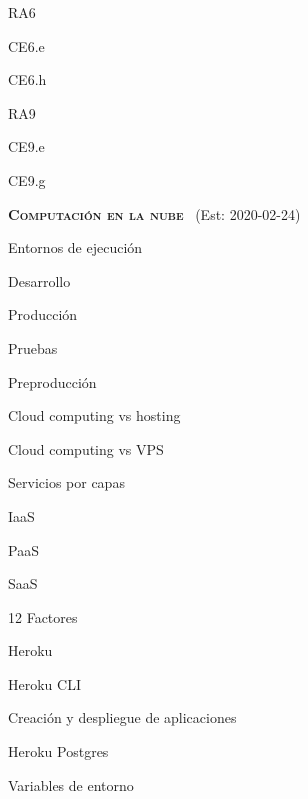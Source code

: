 \begin{longenum}
\begin{longenum}
\begin{longenum}
\begin{longenum}
                \item RA6
                \begin{longenum}
                    \item CE6.e
                    \item CE6.h
                \end{longenum}
                \item RA9
                \begin{longenum}
                    \item CE9.e
                    \item CE9.g
                \end{longenum}
            \end{longenum}
        \end{longenum}
    \end{longenum}
    \item \textbf{\textsc{Computación en la nube}} \ (Est: 2020-02-24)
    \begin{longenum}
        \item Entornos de ejecución
        \begin{longenum}
            \item Desarrollo
            \item Producción
            \item Pruebas
            \item Preproducción
        \end{longenum}
        \item Cloud computing vs hosting
        \item Cloud computing vs VPS
        \item Servicios por capas
        \begin{longenum}
            \item IaaS
            \item PaaS
            \item SaaS
        \end{longenum}
        \item 12 Factores
        \item Heroku
        \begin{longenum}
            \item Heroku CLI
            \item Creación y despliegue de aplicaciones
            \item Heroku Postgres
            \item Variables de entorno

\end{longenum}
\end{longenum}
\end{longenum}
